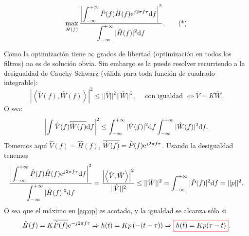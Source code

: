 \begin{equation}
    \label{eq:op}
    \max_{\hat{H}(f)} \frac{\left|\displaystyle\int_{-\infty}^{+\infty}
\hat{P}(f) \hat{H}(f) \mathrm{e}^{j2\pi f \tau}\mathrm{d}
f\right|^2}{\displaystyle\int_{-\infty}^{+\infty} |\hat{H}(f)|^2\mathrm{d}
f}. \tag{*}
\end{equation}

Como la optimización tiene $\infty$ grados de libertad
(optimización en todos los filtros) no es de solución obvia. Sin
embargo se la puede resolver recurriendo a la desigualdad de
Cauchy-Schwarz (válida para toda función de cuadrado integrable):
\[\left|\left\langle\hat{V}(f),\hat{W}(f)\right\rangle\right|^2 \leq ||\hat{V}||^2
||\hat{W}||^2, \quad \text{ con igualdad }\Leftrightarrow \hat{V}
= K \hat{W}.\] O sea:
\[\left|\int \hat{V}(f) \overline{\hat{W}(f)}\mathrm{d} f\right|^2\leq \int_{-\infty}^{+\infty}
|\hat{V}(f)|^2\mathrm{d} f \int_{-\infty}^{+\infty} |\hat{W}(f)|^2\mathrm{d} f.\]
Tomemos aquí $\hat{V}(f) = \hat{H}(f)$, $\overline{\hat{W}(f)} =
\hat{P}(f)\mathrm{e}^{j2\pi f \tau}$. Usando la desigualdad tenemos
%
\[
\frac{\left|\displaystyle\int_{-\infty}^{+\infty} \hat{P}(f)
\hat{H}(f) \mathrm{e}^{j2\pi f \tau}\mathrm{d}
f\right|^2}{\displaystyle\int_{-\infty}^{+\infty} |\hat{H}(f)|^2\mathrm{d}
f} = \frac{\left|\left\langle
\hat{V},\hat{W}\right\rangle\right|^2}{||\hat{V}||^2}\leq
||\hat{W}||^2 = \int_{-\infty}^{+\infty} |\hat{P}(f)|^2\mathrm{d} f =
||p||^2.\]
O sea que el máximo en \eqref{eq:op} es acotado, y la
igualdad se alcanza sólo si
\[\hat{H}(f) = K\overline{\hat{P}(f)}\e^{-j2\pi f \tau} \Rightarrow h(t)=K
p\left(-(t-\tau)\right)\Rightarrow \col{h(t) = K p(\tau-t)}.\]

\begin{figure}[htb]
    \centering\begin{minipage}{\textwidth}
    \endpgfgraphicnamed\end{minipage}
\end{figure}
\FloatBarrier

